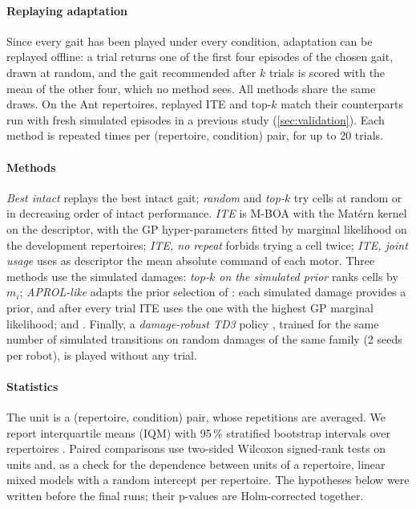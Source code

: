 \paragraph{Replaying adaptation} Since every gait has been played under every condition, adaptation can be replayed
offline: a trial returns one of the first four episodes of the chosen gait, drawn at random, and the gait recommended
after $k$ trials is scored with the mean of the other four, which no method sees. All methods share the same draws.
On the Ant repertoires, replayed ITE and top-$k$ match their counterparts run with fresh simulated episodes in a
previous study (\cref{sec:validation}). Each method is repeated \NRepeats{} times per (repertoire, condition) pair,
for up to 20 trials.

\paragraph{Methods} \emph{Best intact} replays the best intact gait; \emph{random} and \emph{top-$k$} try cells at random
or in decreasing order of intact performance. \emph{ITE} is M-BOA with the Mat\'ern kernel on the descriptor, with the
GP hyper-parameters fitted by marginal likelihood on the development repertoires; \emph{ITE, no repeat} forbids trying
a cell twice; \emph{ITE, joint usage} uses as descriptor the mean absolute command of each motor. Three methods use the
simulated damages: \emph{top-$k$ on the simulated prior} ranks cells by $m_i$; \emph{APROL-like} adapts the prior
selection of \citet{kaushik2020adaptive}: each simulated damage provides a prior, and after every trial ITE uses the
one with the highest GP marginal likelihood; and \itesd{}. Finally, a \emph{damage-robust TD3} policy
\cite{fujimoto2018addressing}, trained for the same number of simulated transitions on random damages of the same
family (2 seeds per robot), is played without any trial.

\paragraph{Statistics} The unit is a (repertoire, condition) pair, whose repetitions are averaged. We report
interquartile means (IQM) with 95\,\% stratified bootstrap intervals over repertoires \cite{agarwal2021deep}. Paired
comparisons use two-sided Wilcoxon signed-rank tests on units and, as a check for the dependence between units of a
repertoire, linear mixed models with a random intercept per repertoire. The hypotheses below were written before the
final runs; their p-values are Holm-corrected together.
